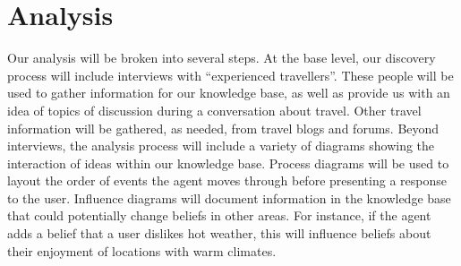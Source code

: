 \documentclass[11pt]{article} %
\begin{document}
\section{Analysis}
Our analysis will be broken into several steps. At the base level, our discovery process will include interviews with “experienced travellers”. These people will be used to gather information for our knowledge base, as well as provide us with an idea of topics of discussion during a conversation about travel. Other travel information will be gathered, as needed, from travel blogs and forums.
Beyond interviews, the analysis process will include a variety of diagrams showing the interaction of ideas within our knowledge base.
Process diagrams will be used to layout the order of events the agent moves through before presenting a response to the user.
Influence diagrams will document information in the knowledge base that could potentially change beliefs in other areas. For instance, if the agent adds a belief that a user dislikes hot weather, this will influence beliefs about their enjoyment of locations with warm climates.
\end{document}
